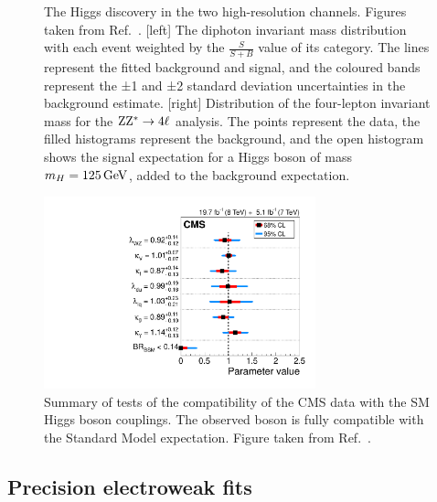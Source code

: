 \begin{figure}[p]
  \caption{The Higgs discovery in the two high-resolution channels. Figures taken from
Ref.~\cite{Chatrchyan:2012ufa}.
  [left] The diphoton invariant mass distribution with each event weighted by the
$\frac{S}{S+B}$ value of its category. The lines represent the fitted background and signal, and
the coloured bands represent the ±1 and ±2 standard deviation uncertainties in the background
estimate. 
  [right] Distribution of the four-lepton invariant mass for the $\mathrm{Z}\mathrm{Z}^* \rightarrow 4\ell$
analysis. The points represent the data, the filled histograms represent the background, and the
open histogram shows the signal expectation for a Higgs boson of mass $m_H = 125\,\text{Ge\hspace{-.08em}V}$, added to the
background expectation.
  \label{fig:higgs_discovery}}
\end{figure}

\begin{figure}[p]
  \centering
  \includegraphics[width=0.7\textwidth]{figures/standardmodel/sqr_summary_lhcxswg}
  \caption{ Summary of tests of the compatibility of the CMS data with the SM Higgs boson
couplings. The observed boson is fully compatible with the Standard Model expectation. Figure taken
from Ref.~\cite{Khachatryan:2014jba}.
  \label{fig:higgs_sm_test}}
\end{figure}


\subsection{Precision electroweak fits}

